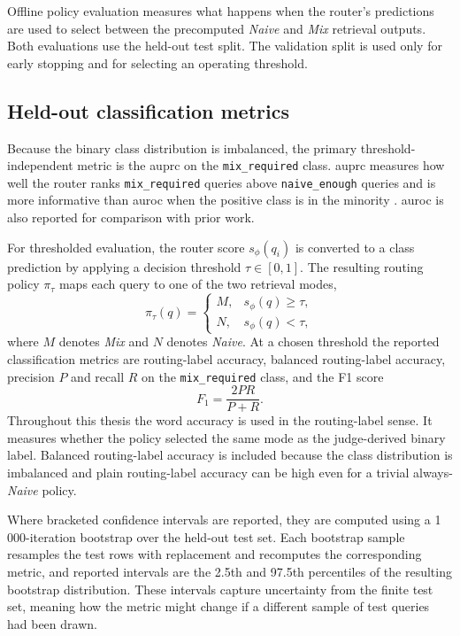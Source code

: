 \documentclass[english, bibtex]{kththesis}               %
\numberwithin{listing}{chapter}
\begin{document}
Offline policy evaluation measures what happens when the router's predictions are used to select between the precomputed \emph{Naive} and \emph{Mix} retrieval outputs. Both evaluations use the held-out test split. The validation split is used only for early stopping and for selecting an operating threshold.

\subsection{Held-out classification metrics}
\label{sec:methodHeldOut}

Because the binary class distribution is imbalanced, the primary threshold-independent metric is the \gls{auprc} on the \texttt{mix\_required} class. \Gls{auprc} measures how well the router ranks \texttt{mix\_required} queries above \texttt{naive\_enough} queries and is more informative than \gls{auroc} when the positive class is in the minority \cite{saito2015precision}. \Gls{auroc} is also reported for comparison with prior work.

For thresholded evaluation, the router score \(s_\phi(q_i)\) is converted to a class prediction by applying a decision threshold \(\tau \in [0, 1]\). The resulting routing policy \(\pi_\tau\) maps each query to one of the two retrieval modes,
\begin{equation}
\label{eq:routingPolicy}
\pi_\tau(q) =
\begin{cases}
M, & s_\phi(q) \geq \tau,\\
N, & s_\phi(q) < \tau,
\end{cases}
\end{equation}
where \(M\) denotes \emph{Mix} and \(N\) denotes \emph{Naive}. At a chosen threshold the reported classification metrics are routing-label accuracy, balanced routing-label accuracy, precision \(P\) and recall \(R\) on the \texttt{mix\_required} class, and the F1 score
\begin{equation}
\label{eq:f1}
F_1 = \frac{2 P R}{P + R}.
\end{equation}
Throughout this thesis the word accuracy is used in the routing-label sense. It measures whether the policy selected the same mode as the judge-derived binary label. Balanced routing-label accuracy is included because the class distribution is imbalanced and plain routing-label accuracy can be high even for a trivial always-\emph{Naive} policy.

Where bracketed confidence intervals are reported, they are computed using a 1\,000-iteration bootstrap over the held-out test set. Each bootstrap sample resamples the test rows with replacement and recomputes the corresponding metric, and reported intervals are the 2.5th and 97.5th percentiles of the resulting bootstrap distribution. These intervals capture uncertainty from the finite test set, meaning how the metric might change if a different sample of test queries had been drawn.
\end{document}
